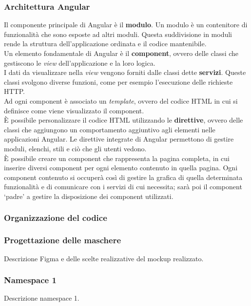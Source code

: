 \subsubsection{Architettura Angular}
Il componente principale di Angular è il \textbf{modulo}. Un modulo è un contenitore di funzionalità che sono esposte ad altri moduli. Questa suddivisione in moduli rende la struttura dell'applicazione ordinata e il codice mantenibile.\\
Un elemento fondamentale di Angular è il \textbf{component}, ovvero delle classi che gestiscono le \textit{view} dell'applicazione e la loro logica.\\
I dati da visualizzare nella \textit{view} vengono forniti dalle classi dette \textbf{servizi}. Queste classi svolgono diverse funzioni, come per esempio  l'esecuzione delle richieste HTTP.\\  
Ad ogni component è associato un \textit{template}, ovvero del codice HTML in cui si definisce come viene visualizzato il component.\\
È possibile personalizzare il codice HTML utilizzando le \textbf{direttive}, ovvero delle classi che aggiungono un comportamento aggiuntivo agli elementi nelle applicazioni Angular. Le direttive integrate di Angular permettono di gestire moduli, elenchi, stili e ciò che gli utenti vedono.\\
È possibile creare un component che rappresenta la pagina completa, in cui inserire diversi component per ogni elemento contenuto in quella pagina.
Ogni component contenuto si occuperà così di gestire la grafica di quella determinata funzionalità e di comunicare con i servizi di cui necessita; sarà poi il component \enquote*{padre} a gestire la disposizione dei component utilizzati. 
\subsubsection{Organizzazione del codice}

\subsubsection{Progettazione delle maschere}
Descrizione Figma e delle scelte realizzative del mockup realizzato.


\subsubsection{Namespace 1} %
Descrizione namespace 1.

